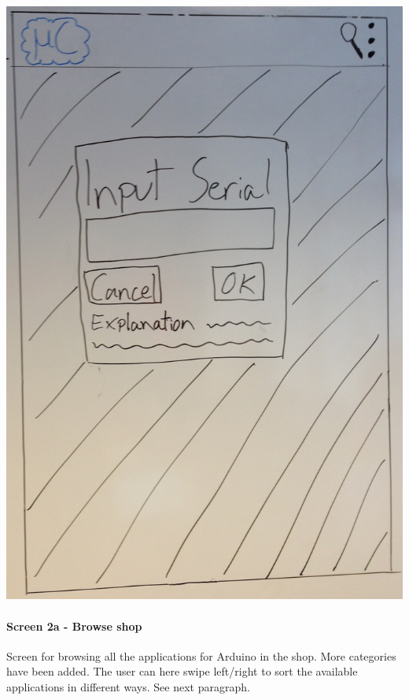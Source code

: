 \begin{image}[H]
\includegraphics[scale=0.2]{images/Design_guide/Screen1b-i.png}
\end{image}


\paragraph{Screen 2a - Browse shop}
Screen for browsing all the applications for Arduino in the shop. More categories have been added. The user can here swipe left/right to sort the available applications in different ways. See next paragraph.

